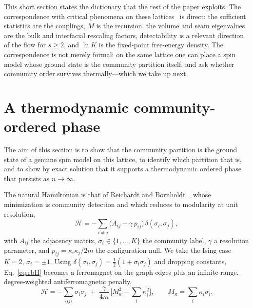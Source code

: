 \documentclass[preprint,12pt]{elsarticle}
\begin{document}
This short section states the dictionary that the rest of the paper exploits.
The correspondence with critical phenomena on these
lattices~\cite{migdal1976,kadanoff1976,berker1979,kaufman1981,griffiths1982} is
direct: the sufficient statistics are the couplings, $M$ is the recursion, the
volume and seam eigenvalues are the bulk and interfacial rescaling factors,
detectability is a relevant direction of the flow for $s\ge2$, and $\ln K$ is
the fixed-point free-energy density. The correspondence is not merely formal:
on the same lattice one can place a spin model whose ground state is the
community partition itself, and ask whether community order survives
thermally---which we take up next.

\section{A thermodynamic community-ordered phase}
\label{sec:rb}

The aim of this section is to show that the community partition is the ground
state of a genuine spin model on this lattice, to identify which partition that
is, and to show by exact solution that it supports a thermodynamic ordered
phase that persists as $n\to\infty$.

The natural Hamiltonian is that of Reichardt and
Bornholdt~\cite{reichardt2004}, whose minimization is community detection and
which reduces to modularity at unit resolution,
\begin{equation}
  \mathcal{H} = -\sum_{i\neq j}\big(A_{ij}-\gamma\,p_{ij}\big)\,
                \delta(\sigma_i,\sigma_j),
  \label{eq:rbH}
\end{equation}
with $A_{ij}$ the adjacency matrix, $\sigma_i\in\{1,\dots,K\}$ the community
label, $\gamma$ a resolution parameter, and $p_{ij}=\kappa_i\kappa_j/2m$ the
configuration null. We take the Ising case $K=2$, $\sigma_i=\pm1$. Using
$\delta(\sigma_i,\sigma_j)=\tfrac12(1+\sigma_i\sigma_j)$ and dropping constants,
Eq.~\eqref{eq:rbH} becomes a ferromagnet on the graph edges plus an
infinite-range, degree-weighted antiferromagnetic penalty,
\begin{equation}
  \mathcal{H} = -\!\sum_{\langle ij\rangle}\!\sigma_i\sigma_j
    \;+\;\frac{\gamma}{4m}\,\Big[M_\kappa^2-\!\sum_i\kappa_i^2\Big],
    \qquad M_\kappa=\sum_i \kappa_i\sigma_i .
  \label{eq:rbIsing}
\end{equation}
\end{document}
